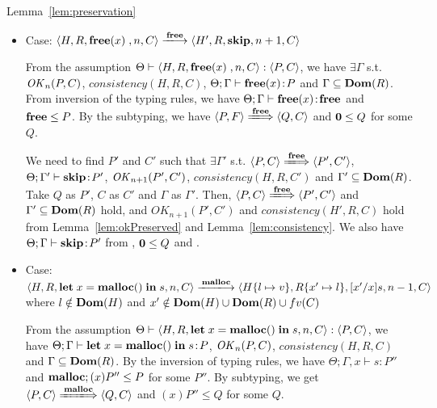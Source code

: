 \begin{pfof}{Lemma~\ref{lem:preservation}}
\begin{itemize}
   we need to find \(P'\) and \(C'\) s.t. \(\exists \Gamma'\) s.t. \(
   \Theta; \Gamma' \vdash
  \SKIP:P'\), \( OK_n(P', C')\), \( \langle P, C \rangle
  \Longrightarrow P', C' \rangle \), \(consistency(H, R, C')\) and
  \(\Gamma' \subseteq \DOM(R)\). Taking \( Q \) as \( P'\), \(C\) as
  \(C'\) and \(\Gamma\) as \(\Gamma'\), then \( \langle P, C \rangle
  \rightarrow \langle P', C' \rangle\) and \(\Gamma' \subseteq
  \DOM(R)\) hold, and then \( OK_n(P', C')\) and \(consistency(H, R,
  C')\) hold from Lemma~\ref{lem:okPreserved} and
  Lemma~\ref{lem:consistency} . From ,  and \( 0
  \le Q\), then \( \Theta; \Gamma \vdash \SKIP:P'\) holds.

\item Case: \(\langle H, R, \FREE, n, C\rangle \xlongrightarrow{\Free}
  \langle H', R, \SKIP, n + 1, C \rangle \)

  From the assumption \( \Theta \vdash \langle H, R, \mathbf{free}(x)\;, n, C
  \rangle : \langle P, C \rangle\), we have \(\exists \Gamma\)
  s.t. \(\mathit{OK}_n(P, C)\), \(consistency(H, R, C)\), \(\Theta; \Gamma
  \vdash \mathbf{free}(x) \!:\! P\) and \(\Gamma \subseteq \mathbf{Dom}(R)\).  From
  inversion of the typing rules, we have \(\Theta; \Gamma \vdash
  \mathbf{free}(x) \!:\! \mathbf{free}\) and \(\mathbf{free} \le P\). By the subtyping, we have
  \( \langle P, F \rangle \xLongrightarrow{\Free} \langle Q, C
  \rangle\) and \(\mathbf{0} \le Q \) for some \(Q\).

  We need to find \(P'\) and \(C'\) such that \(\exists \Gamma'\)
  s.t. \( \langle P, C \rangle \xLongrightarrow{\Free} \langle P', C'
  \rangle \), \(\Theta; \Gamma' \vdash \mathbf{skip} \!:\! P'\),
  \(\mathit{OK}_{n+1}(P', C')\), \(consistency(H, R, C')\) and \(\Gamma'
  \subseteq \DOM(R)\). Take \(Q\) as \(P'\), \(C\) as \(C'\) and
  \(\Gamma\) as \(\Gamma'\).  Then, \( \langle P, C \rangle
  \xLongrightarrow{\Free} \langle P', C' \rangle \) and \(\Gamma'
  \subseteq \DOM(R)\) hold, and \(OK_{n+1}(P', C')\) and
  \(consistency(H', R, C)\) hold from Lemma~\ref{lem:okPreserved} and
  Lemma~\ref{lem:consistency}.  We also have \(\Theta; \Gamma
  \vdash \mathbf{skip} \!:\! P'\) from , \(\mathbf{0} \le Q\) and
  .

\item Case: \( \langle H, R, \LET x = \MALLOC \IN s, n, C\rangle
  \xlongrightarrow{\Malloc} \langle H\set{l \mapsto v}, R\set{x'
    \mapsto l}, [x'/x]s, n - 1, C \rangle \) where \(l \notin
  \mathbf{Dom}(H)\) and \(x' \notin \mathbf{Dom}(H)\cup\mathbf{Dom}(R)\cup fv(C)\)

  From the assumption \( \Theta \vdash \langle H, R, \mathbf{let}\; x = \mathbf{malloc()}\;
  \mathbf{in}\; s, n, C \rangle : \langle P, C \rangle\), we have \(\Theta;
  \Gamma \vdash \mathbf{let}\; x = \mathbf{malloc()}\; \mathbf{in}\; s \!:\! P\), \(\mathit{OK}_{n}(P, C)\),
  \(consistency(H, R, C)\) and \(\Gamma \subseteq \mathbf{Dom}(R)\). By the
  inversion of typing rules, we have \(\Theta; \Gamma, x \vdash s :
  P'' \) and \( \mathbf{malloc}; (x)P'' \le P \) for some \(P''\). By
  subtyping, we get \( \langle P, C \rangle \xLongrightarrow{\Malloc}
  \langle Q, C \rangle \) and \( (x)P'' \le Q\) for some \(Q\).


\end{itemize}
\end{pfof}
